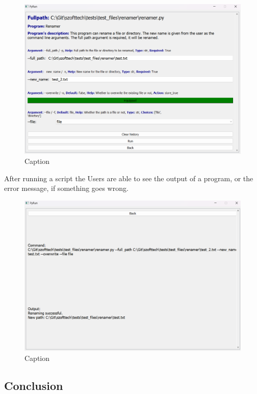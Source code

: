 \documentclass{article}
\begin{document}
\begin{figure}[h]
    \centering
    \includegraphics[width=1\linewidth]{img/config_page.png}
    \caption{Caption}
    \label{fig:enter-label}
\end{figure}

\clearpage

After running a script the Users are able to see the output of a program, or the error message, if something goes wrong.

\begin{figure}
    \centering
    \includegraphics[width=1\linewidth]{img/runner_page.png}
    \caption{Caption}
    \label{fig:enter-label}
\end{figure}

\subsection{Conclusion}
\end{document}
